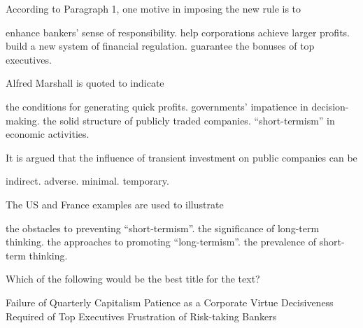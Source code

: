 \item According to Paragraph 1, one motive in imposing the new rule is to
\begin{tasks}
	\task enhance bankers' sense of responsibility.
	\task help corporations achieve larger profits.
	\task build a new system of financial regulation.
	\task guarantee the bonuses of top executives.
\end{tasks}
\item Alfred Marshall is quoted to indicate
\begin{tasks}
	\task the conditions for generating quick profits.
	\task governments' impatience in decision-making.
	\task the solid structure of publicly traded companies.
	\task ``short-termism'' in economic activities.
\end{tasks}
\item It is argued that the influence of transient investment on public companies can be
\begin{tasks}
	\task indirect.
	\task adverse.
	\task minimal.
	\task temporary.
\end{tasks}
\item The US and France examples are used to illustrate
\begin{tasks}
	\task the obstacles to preventing ``short-termism''.
	\task the significance of long-term thinking.
	\task the approaches to promoting ``long-termism''.
	\task the prevalence of short-term thinking.
\end{tasks}
\item Which of the following would be the best title for the text?
\begin{tasks}
	\task Failure of Quarterly Capitalism
	\task Patience as a Corporate Virtue
	\task Decisiveness Required of Top Executives
	\task Frustration of Risk-taking Bankers
\end{tasks}
